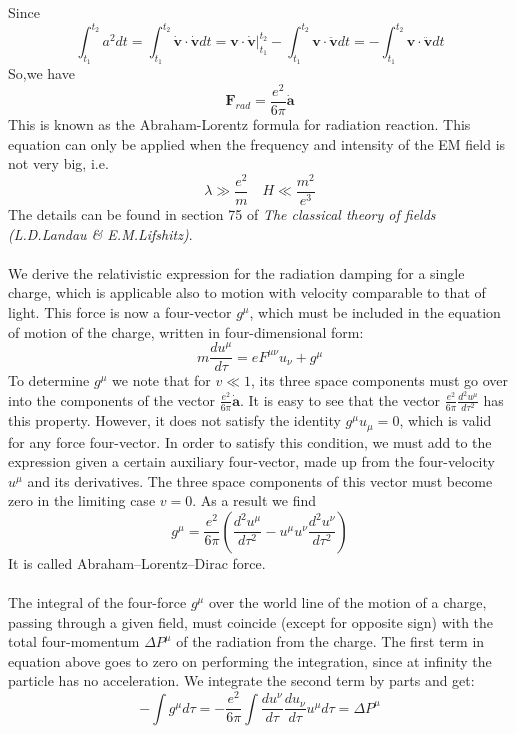 Since
\[\int_{t_{1}}^{t_{2}}a^{2}dt = \int_{t_{1}}^{t_{2}}\dot{\bm{v}}\cdot\dot{\bm{v}}dt = \bm{v}\cdot\dot{\bm{v}}|_{t_{1}}^{t_{2}}-\int_{t_{1}}^{t_{2}}\bm{v} \cdot\ddot{\bm{v}}dt = -\int_{t_{1}}^{t_{2}}\bm{v} \cdot\ddot{\bm{v}}dt\]
So,we have
\[\bm{F}_{rad} = \frac{e^2}{6\pi} \dot{\bm{a}}\]
This is known as the Abraham-Lorentz formula for radiation reaction. This equation can only be applied when the frequency and intensity of the EM field is not very big, i.e.
\[\lambda \gg \frac{e^2}{m} \quad H \ll \frac{m^2}{e^3}\]
The details can be found in section 75 of \emph{The classical theory of fields (L.D.Landau \& E.M.Lifshitz)}.
\\ \\
We derive the relativistic expression for the radiation damping for a single charge, which is applicable also to motion with velocity comparable to that of light. This force is now a four-vector $g^{\mu}$, which must be included in the equation of motion of the charge, written in four-dimensional form:
\[m\frac{du^{\mu}}{d\tau} = eF^{\mu\nu}u_{\nu} + g^{\mu}\]
To determine $g^{\mu}$ we note that for $v \ll 1$, its three space components must go over into the components of the vector $\frac{e^2}{6\pi}\dot{\bm{a}}$. It is easy to see that the vector $\frac{e^2}{6\pi} \frac{d^2u^{\mu}}{d\tau^2}$ has this property. However, it does not satisfy the identity $g^{\mu}u_{\mu} = 0$, which is valid for any force four-vector. 
In order to satisfy this condition, we must add to the expression given a certain auxiliary four-vector, made up from the four-velocity $u^{\mu}$ and its derivatives. 
The three space components of this vector must become zero in the limiting case $v = 0$. As a result we find
\[g^{\mu} = \frac{e^2}{6\pi} \left( \frac{d^2u^{\mu}}{d\tau^2} -u^{\mu}u^{\nu}\frac{d^2u^{\nu}}{d\tau^2} \right)\]
It is called Abraham–Lorentz–Dirac force.
\\ \\
The integral of the four-force $g^{\mu}$ over the world line of the motion of a charge, passing through a given field, must coincide (except for opposite sign) with the total four-momentum $\Delta P^{\mu}$ of the radiation from the charge. 
The first term in equation above goes to zero on performing the integration, since at infinity the particle has no acceleration. We integrate the second term by parts and get:
\[-\int g^{\mu} d\tau = -\frac{e^2}{6\pi} \int \frac{du^{\nu}}{d\tau} \frac{du_{\nu}}{d\tau} u^{\mu}d\tau = \Delta P^{\mu}\]

